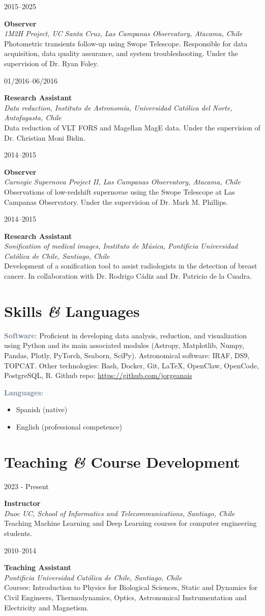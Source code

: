 \documentclass[10pt, a4paper]{article}
\newcommand{\amper}{{\itshape\addfontfeatures{Scale=.95}\&}}
\newlength{\datebox}
\newlength{\textbox}
\newcommand{\workitem}[4]{\noindent\parbox[t]{\datebox}{#1}%
    \parbox[t]{\textbox}{\textbf{\textcolor{ViridianGreen}{#2}}\\
    \textit{#3}\\\textcolor{Jet}{\small #4}}\par\vspace{0.4cm}}
\newcommand{\skillitem}[2]{\noindent\textbf{\textcolor{SlateGray}{#1}}: #2\par\vspace{0.2cm}}
\begin{document}
\workitem{2015--2025}{Observer}{1M2H Project, UC Santa Cruz, Las Campanas Observatory, Atacama, Chile}{Photometric transients follow-up using Swope Telescope. Responsible for data acquisition, data quality assurance, and system troubleshooting. Under the supervision of Dr. Ryan Foley.}
\workitem{01/2016--06/2016}{Research Assistant}{Data reduction, Instituto de Astronomía, Universidad Católica del Norte, Antofagasta, Chile}{Data reduction of VLT FORS and Magellan MagE data. Under the supervision of Dr. Christian Moni Bidin.}
\workitem{2014--2015}{Observer}{Carnegie Supernova Project II, Las Campanas Observatory, Atacama, Chile}{Observations of low-redshift supernovae using the Swope Telescope at Las Campanas Observatory. Under the supervision of Dr. Mark M. Phillips.}
\workitem{2014--2015}{Research Assistant}{Sonification of medical images, Instituto de Música, Pontificia Universidad Católica de Chile, Santiago, Chile}{Development of a sonification tool to assist radiologists in the detection of breast cancer. In collaboration with Dr. Rodrigo Cádiz and Dr. Patricio de la Cuadra.}

\section*{Skills \amper{} Languages}
\skillitem{Software}{Proficient in developing data analysis, reduction, and visualization using Python and its main associated modules (Astropy, Matplotlib, Numpy, Pandas, Plotly, PyTorch, Seaborn, SciPy). Astronomical software: IRAF, DS9, TOPCAT. Other technologies: Bash, Docker, Git, \LaTeX, OpenClaw, OpenCode, PostgreSQL, R. Github repo: \url{https://github.com/jorgeanais}}
\skillitem{Languages}{
\begin{itemize}
    \item Spanish (native)
    \item English (professional competence)
\end{itemize}}

\section*{Teaching \amper{} Course Development}
\workitem{2023 - Present}{Instructor}{Duoc UC, School of Informatics and Telecommunications, Santiago, Chile}{Teaching Machine Learning and Deep Learning courses for computer engineering students.}
\workitem{2010--2014}{Teaching Assistant}{Pontificia Universidad Católica de Chile, Santiago, Chile}{Courses: Introduction to Physics for Biological Sciences, Static and Dynamics for Civil Engineers, Thermodynamics, Optics, Astronomical Instrumentation and Electricity and Magnetism.}
\end{document}
